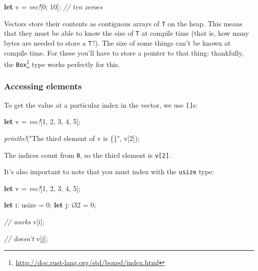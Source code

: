 \documentclass[a4paper,]{book}
\newenvironment{Shaded}{\begin{snugshade}}{\end{snugshade}}
\newcommand{\KeywordTok}[1]{\textcolor[rgb]{0.13,0.29,0.53}{\textbf{{#1}}}}
\newcommand{\DataTypeTok}[1]{\textcolor[rgb]{0.13,0.29,0.53}{{#1}}}
\newcommand{\DecValTok}[1]{\textcolor[rgb]{0.00,0.00,0.81}{{#1}}}
\newcommand{\StringTok}[1]{\textcolor[rgb]{0.31,0.60,0.02}{{#1}}}
\newcommand{\CommentTok}[1]{\textcolor[rgb]{0.56,0.35,0.01}{\textit{{#1}}}}
\newcommand{\PreprocessorTok}[1]{\textcolor[rgb]{0.56,0.35,0.01}{\textit{{#1}}}}
\newcommand{\NormalTok}[1]{{#1}}
\renewcommand{\href}[2]{#2\footnote{\url{#1}}}
\begin{document}
\begin{Shaded}
\begin{Highlighting}[]
\KeywordTok{let} \NormalTok{v = }\PreprocessorTok{vec!}\NormalTok{[}\DecValTok{0}\NormalTok{; }\DecValTok{10}\NormalTok{]; }\CommentTok{// ten zeroes}
\end{Highlighting}
\end{Shaded}

Vectors store their contents as contiguous arrays of \texttt{T} on the
heap. This means that they must be able to know the size of \texttt{T}
at compile time (that is, how many bytes are needed to store a
\texttt{T}?). The size of some things can't be known at compile time.
For these you'll have to store a pointer to that thing: thankfully, the
\href{http://doc.rust-lang.org/std/boxed/index.html}{\texttt{Box}} type
works perfectly for this.

\subsubsection{Accessing elements}\label{accessing-elements}

To get the value at a particular index in the vector, we use
\texttt{{[}{]}}s:

\begin{Shaded}
\begin{Highlighting}[]
\KeywordTok{let} \NormalTok{v = }\PreprocessorTok{vec!}\NormalTok{[}\DecValTok{1}\NormalTok{, }\DecValTok{2}\NormalTok{, }\DecValTok{3}\NormalTok{, }\DecValTok{4}\NormalTok{, }\DecValTok{5}\NormalTok{];}

\PreprocessorTok{println!}\NormalTok{(}\StringTok{"The third element of v is \{\}"}\NormalTok{, v[}\DecValTok{2}\NormalTok{]);}
\end{Highlighting}
\end{Shaded}

The indices count from \texttt{0}, so the third element is
\texttt{v{[}2{]}}.

It's also important to note that you must index with the \texttt{usize}
type:

\begin{Shaded}
\begin{Highlighting}[]
\KeywordTok{let} \NormalTok{v = }\PreprocessorTok{vec!}\NormalTok{[}\DecValTok{1}\NormalTok{, }\DecValTok{2}\NormalTok{, }\DecValTok{3}\NormalTok{, }\DecValTok{4}\NormalTok{, }\DecValTok{5}\NormalTok{];}

\KeywordTok{let} \NormalTok{i: }\DataTypeTok{usize} \NormalTok{= }\DecValTok{0}\NormalTok{;}
\KeywordTok{let} \NormalTok{j: }\DataTypeTok{i32} \NormalTok{= }\DecValTok{0}\NormalTok{;}

\CommentTok{// works}
\NormalTok{v[i];}

\CommentTok{// doesn’t}
\NormalTok{v[j];}
\end{Highlighting}
\end{Shaded}
\end{document}
